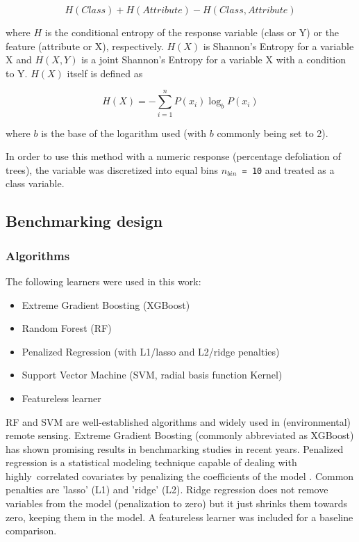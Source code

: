 \documentclass[remotesensing,article,submit,moreauthors,pdftex]{Definitions/mdpi}
\begin{document}
\begin{equation}
	H(Class) + H(Attribute) - H(Class, Attribute)
\end{equation}

where \(H\) is the conditional entropy of the response variable (class or Y) or the feature (attribute or X), respectively.
$H(X)$ is Shannon's Entropy \cite{shannon1948} for a variable X and $H(X, Y)$ is a joint Shannon's Entropy for a variable X with a condition to Y.
$H(X)$ itself is defined as

\begin{equation}
	H(X) = - \sum_{i=1}^{n} P(x_i)\log_bP(x_i)
\end{equation}

where $b$ is the base of the logarithm used (with $b$ commonly being set to 2).

In order to use this method with a numeric response (percentage defoliation of trees), the variable was discretized into equal bins \texttt{\(n_{bin}\) = 10} and treated as a class variable.

\subsection{Benchmarking design}

\subsubsection{Algorithms}

The following learners were used in this work:

\begin{itemize}
	\item  Extreme Gradient Boosting (XGBoost)
	\item  Random Forest (RF)
	\item  Penalized Regression (with L1/lasso and L2/ridge penalties)
	\item  Support Vector Machine (SVM, radial basis function Kernel)
	\item  Featureless learner
\end{itemize}

RF and SVM are well-established algorithms and widely used in (environmental) remote sensing.
Extreme Gradient Boosting (commonly abbreviated as XGBoost) has shown promising results in benchmarking studies in recent years.
Penalized regression is a statistical modeling technique capable of dealing with highly\ correlated covariates by penalizing the coefficients of the model \cite{hastie2001}.
Common penalties are 'lasso' (L1) and 'ridge' (L2).
Ridge regression does not remove variables from the model (penalization to zero) but it just shrinks them towards zero, keeping them in the model.
A featureless learner was included for a baseline comparison.
\end{document}
